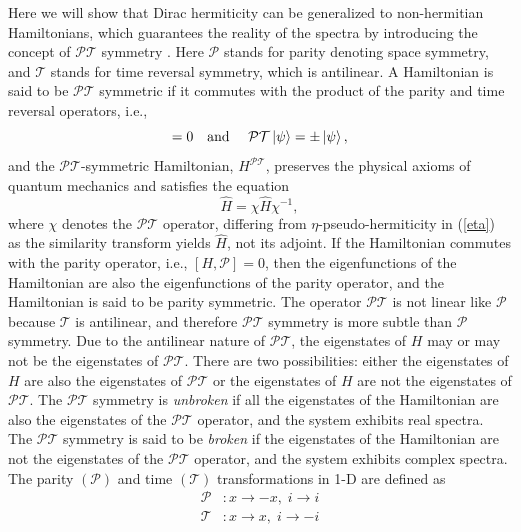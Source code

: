 \documentclass[a4paper, 12pt]{article}
\begin{document}
Here we will show that Dirac hermiticity can be generalized to non-hermitian Hamiltonians, which guarantees the reality of the spectra by introducing the concept of \( \mathcal{PT} \) symmetry \cite{bender1998real, bender1999pt}. Here \( \mathcal{P} \) stands for parity denoting space symmetry, and \( \mathcal{T} \) stands for time reversal symmetry, which is antilinear. A Hamiltonian is said to be \( \mathcal{PT} \) symmetric if it commutes with the product of the parity and time reversal operators, i.e.,
\begin{equation}
[H,\mathcal{PT}]=0\quad \text{and }\quad \mathcal{PT}\ket{\psi}=\pm\ket{\psi},
\end{equation}
and the \( \mathcal{PT} \)-symmetric Hamiltonian, \( H^{\mathcal{PT}} \), preserves the physical axioms of quantum mechanics and satisfies the equation
\begin{equation}
    \hat{H}=\chi\hat{H}\chi^{-1},
\end{equation}
where \( \chi \) denotes the \( \mathcal{PT} \) operator, differing from \( \eta \)-pseudo-hermiticity in (\ref{eta}) as the similarity transform yields \( \hat{H} \), not its adjoint. If the Hamiltonian commutes with the parity operator, i.e., \( [H,\mathcal{P}]=0 \), then the eigenfunctions of the Hamiltonian are also the eigenfunctions of the parity operator, and the Hamiltonian is said to be parity symmetric. The operator \( \mathcal{PT} \) is not linear like \( \mathcal{P} \) because \( \mathcal{T} \) is antilinear, and therefore \( \mathcal{PT} \) symmetry is more subtle than \( \mathcal{P} \) symmetry. Due to the antilinear nature of \( \mathcal{PT} \), the eigenstates of \( H \) may or may not be the eigenstates of \( \mathcal{PT} \). There are two possibilities: either the eigenstates of \( H \) are also the eigenstates of \( \mathcal{PT} \) or the eigenstates of \( H \) are not the eigenstates of \( \mathcal{PT} \). The \( \mathcal{PT} \) symmetry is \textit{unbroken} if all the eigenstates of the Hamiltonian are also the eigenstates of the \( \mathcal{PT} \) operator, and the system exhibits real spectra. The \( \mathcal{PT} \) symmetry is said to be \textit{broken} if the eigenstates of the Hamiltonian are not the eigenstates of the \( \mathcal{PT} \) operator, and the system exhibits complex spectra. The parity \( (\mathcal{P}) \) and time \( (\mathcal{T}) \) transformations in 1-D are defined as
\begin{align*}
\mathcal{P}&:x\rightarrow-x,\;i\rightarrow i\\
\mathcal{T}&:x\rightarrow x,\;i\rightarrow -i
\end{align*}
\end{document}
